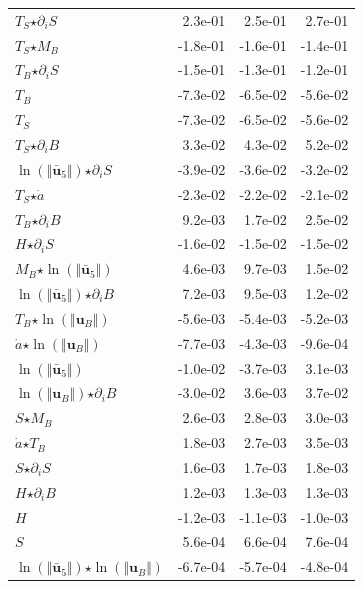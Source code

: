 \begin{table}[H]
\begin{tabular}{l|r|r|r}
  $T_S$$ \star $$\partial_i S$ & 2.3e-01 & 2.5e-01 & 2.7e-01 \\
  $T_S$$ \star $$M_B$ & -1.8e-01 & -1.6e-01 & -1.4e-01 \\
  $T_B$$ \star $$\partial_i S$ & -1.5e-01 & -1.3e-01 & -1.2e-01 \\
  $T_B$ & -7.3e-02 & -6.5e-02 & -5.6e-02 \\
  $T_S$ & -7.3e-02 & -6.5e-02 & -5.6e-02 \\
  $T_S$$ \star $$\partial_i B$ & 3.3e-02 & 4.3e-02 & 5.2e-02 \\
  $\ln\left( \Vert \bar{\mathbf{u}}_{5} \Vert \right)$$ \star $$\partial_i S$ & -3.9e-02 & -3.6e-02 & -3.2e-02 \\
  $T_S$$ \star $$\dot{a}$ & -2.3e-02 & -2.2e-02 & -2.1e-02 \\
  $T_B$$ \star $$\partial_i B$ & 9.2e-03 & 1.7e-02 & 2.5e-02 \\
  $H$$ \star $$\partial_i S$ & -1.6e-02 & -1.5e-02 & -1.5e-02 \\
  $M_B$$ \star $$\ln\left( \Vert \bar{\mathbf{u}}_{5} \Vert \right)$ & 4.6e-03 & 9.7e-03 & 1.5e-02 \\
  $\ln\left( \Vert \bar{\mathbf{u}}_{5} \Vert \right)$$ \star $$\partial_i B$ & 7.2e-03 & 9.5e-03 & 1.2e-02 \\
  $T_B$$ \star $$\ln\left( \Vert \mathbf{u}_B \Vert \right)$ & -5.6e-03 & -5.4e-03 & -5.2e-03 \\
  $\dot{a}$$ \star $$\ln\left( \Vert \mathbf{u}_B \Vert \right)$ & -7.7e-03 & -4.3e-03 & -9.6e-04 \\
  \color{red}$\ln\left( \Vert \bar{\mathbf{u}}_{5} \Vert \right)$ & \color{red}-1.0e-02 & \color{red}-3.7e-03 & \color{red}3.1e-03 \\
  \color{red}$\ln\left( \Vert \mathbf{u}_B \Vert \right)$$ \star $$\partial_i B$ & \color{red}-3.0e-02 & \color{red}3.6e-03 & \color{red}3.7e-02 \\
  $S$$ \star $$M_B$ & 2.6e-03 & 2.8e-03 & 3.0e-03 \\
  $\dot{a}$$ \star $$T_B$ & 1.8e-03 & 2.7e-03 & 3.5e-03 \\
  $S$$ \star $$\partial_i S$ & 1.6e-03 & 1.7e-03 & 1.8e-03 \\
  $H$$ \star $$\partial_i B$ & 1.2e-03 & 1.3e-03 & 1.3e-03 \\
  $H$ & -1.2e-03 & -1.1e-03 & -1.0e-03 \\
  $S$ & 5.6e-04 & 6.6e-04 & 7.6e-04 \\
  $\ln\left( \Vert \bar{\mathbf{u}}_{5} \Vert \right)$$ \star $$\ln\left( \Vert \mathbf{u}_B \Vert \right)$ & -6.7e-04 & -5.7e-04 & -4.8e-04 \\

\end{tabular}
\end{table}
